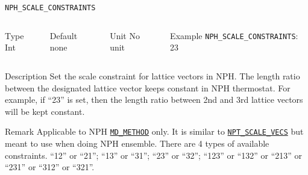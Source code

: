 \begin{frame}[allowframebreaks]{\texttt{NPH\_SCALE\_CONSTRAINTS}} \label{NPH_SCALE_CONSTRAINTS}
\vspace*{-12pt}
\begin{columns}
\begin{block}{Type}
Int
\end{block}

\begin{block}{Default}
none
\end{block}

\begin{block}{Unit}
No unit
\end{block}

\begin{block}{Example}
\texttt{NPH\_SCALE\_CONSTRAINTS}: 23
\end{block}
\end{columns}

\begin{block}{Description}
Set the scale constraint for lattice vectors in NPH. The length ratio between the designated lattice vector keeps constant in NPH thermostat. For example, if ``23'' is set, then the length ratio between 2nd and 3rd lattice vectors will be kept constant.
\end{block}

\begin{block}{Remark}
Applicable to NPH \hyperlink{MD_METHOD}{\texttt{MD\_METHOD}} only.
It is similar to \hyperlink{NPT_SCALE_VECS}{\texttt{NPT\_SCALE\_VECS}} but meant to use when doing NPH ensemble.
There are 4 types of available constraints. ``12'' or ``21''; ``13'' or ``31''; ``23'' or ``32''; ``123'' or ``132'' or ``213'' or ``231'' or ``312'' or ``321''.
\end{block}

\end{frame}




